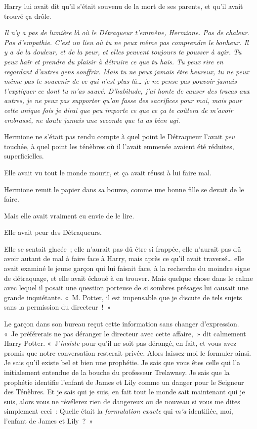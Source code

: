 Harry lui avait dit qu'il s'était souvenu de la mort de ses parents, et qu'il avait trouvé ça drôle.

\emph{Il n'y a pas de lumière là où le Détraqueur t'emmène, Hermione. Pas de chaleur. Pas d'empathie. C'est un lieu où tu ne peux même pas comprendre le bonheur. Il y a de la douleur, et de la peur, et elles peuvent toujours te pousser à agir. Tu peux haïr et prendre du plaisir à détruire ce que tu hais. Tu peux rire en regardant d'autres gens souffrir. Mais tu ne peux jamais être heureux, tu ne peux même pas te souvenir de ce qui n'est plus là… je ne pense pas pouvoir jamais t'expliquer ce dont tu m'as sauvé. D'habitude, j'ai honte de causer des tracas aux autres, je ne peux pas supporter qu'on fasse des sacrifices pour moi, mais pour cette unique fois je dirai que peu importe ce que ce ça te coûtera de m'avoir embrassé, ne doute jamais une seconde que tu as bien agi.}

Hermione ne s'était pas rendu compte à quel point le Détraqueur l'avait \emph{peu} touchée, à quel point les ténèbres où il l'avait emmenée avaient été réduites, superficielles.

Elle avait vu tout le monde mourir, et ça avait réussi à lui faire mal.

Hermione remit le papier dans sa bourse, comme une bonne fille se devait de le faire.

Mais elle avait vraiment eu envie de le lire.

Elle avait peur des Détraqueurs.


Elle se sentait glacée~; elle n'aurait pas dû être si frappée, elle n'aurait pas dû avoir autant de mal à faire face à Harry, mais après ce qu'il avait traversé… elle avait examiné le jeune garçon qui lui faisait face, à la recherche du moindre signe de détraquage, et elle avait échoué à en trouver. Mais quelque chose dans le calme avec lequel il posait une question porteuse de si sombres présages lui causait une grande inquiétante. «~M. Potter, il est impensable que je discute de tels sujets sans la permission du directeur~!~»

Le garçon dans son bureau reçut cette information sans changer d'expression. «~Je préférerais ne pas déranger le directeur avec cette affaire,~» dit calmement Harry Potter. «~J'\emph{insiste} pour qu'il ne soit pas dérangé, en fait, et vous avez promis que notre conversation resterait privée. Alors laissez-moi le formuler ainsi. Je sais qu'il existe bel et bien une prophétie. Je sais que vous êtes celle qui l'a initialement entendue de la bouche du professeur Trelawney. Je sais que la prophétie identifie l'enfant de James et Lily comme un danger pour le Seigneur des Ténèbres. Et je sais qui je suis, en fait tout le monde sait maintenant qui je suis, alors vous ne révélerez rien de dangereux ou de nouveau si vous me dites simplement ceci~: Quelle était la \emph{formulation exacte} qui \emph{m'a} identifiée, moi, l'enfant de James et Lily~?~»

